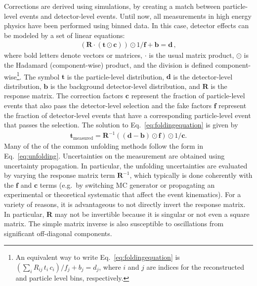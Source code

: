 Corrections are derived using simulations, by creating a match between particle-level events and detector-level events.  Until now, all measurements in high energy physics have been performed using binned data.   In this case, detector effects can be modeled by a set of linear equations:
\begin{align}
\label{eq:foldingequation}
\left(\textbf{R}\cdot (\textbf{t}\odot \textbf{c})\right)\odot 1/\textbf{f}+\textbf{b}=\textbf{d}\,,
\end{align}
where bold letters denote vectors or matrices, $\cdot$ is the usual matrix product, $\odot$ is the Hadamard (component-wise) product, and the division is defined component-wise\footnote{An equivalent way to write Eq.~\ref{eq:foldingequation} is $\left(\sum_{i}R_{ij}\,t_i\,c_i\right)/f_j+b_j=d_j$, where $i$ and $j$ are indices for the reconstructed and particle level bins, respectively.}. The symbol $\textbf{t}$ is the particle-level distribution, $\textbf{d}$ is the detector-level distribution, $\textbf{b}$ is the background detector-level distribution, and $\textbf{R}$ is the response matrix.  The correction factors $\textbf{c}$ represent the fraction of particle-level events that also pass the detector-level selection and the fake factors $\textbf{f}$ represent the fraction of detector-level events that have a corresponding particle-level event that passes the selection.  The solution to Eq.~\ref{eq:foldingequation} is given by
\begin{align}
\label{eq:unfolding}
\textbf{t}_\text{measured} = \textbf{R}^{-1}\left( (\textbf{d}-\textbf{b})\odot \textbf{f}\right)\odot 1/\textbf{c}.
\end{align}
Many of the of the common unfolding methods follow the form in Eq.~\ref{eq:unfolding}. 
Uncertainties on the measurement are obtained using uncertainty propagation. In particular, the unfolding uncertainties are evaluated by varying the response matrix term $\mathbf{R}^{-1}$, which typically is done coherently with the $\mathbf{f}$ and $\mathbf{c}$ terms (e.g.\ by switching MC generator or propagating an experimental or theoretical systematic that affect the event kinematics).
For a variety of reasons, it is advantageous to not directly invert the response matrix.  In particular, \textbf{R} may not be invertible because it is singular or not even a square matrix.  The simple matrix inverse is also susceptible to oscillations from significant off-diagonal components.

